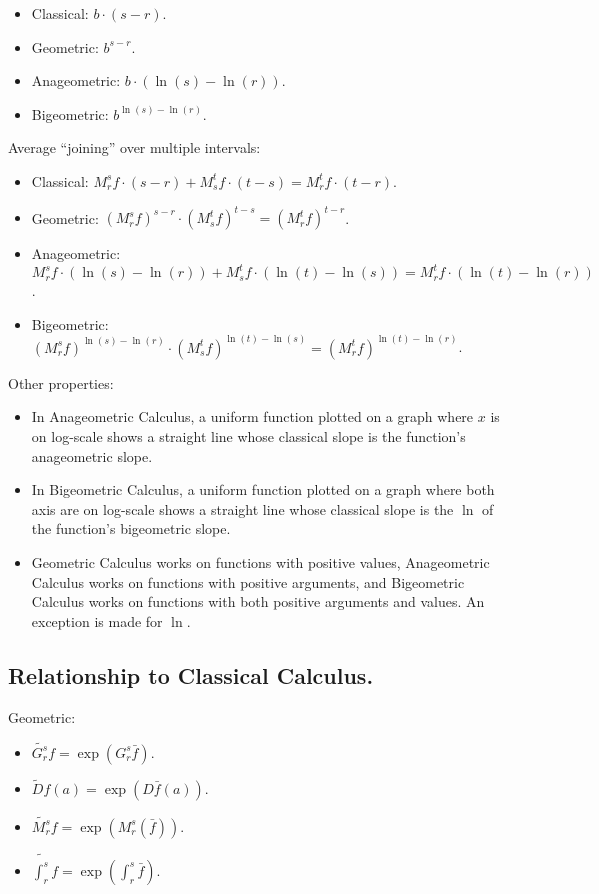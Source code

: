 \begin{itemize}
	\item Classical: $b \cdot (s - r)$.
	\item Geometric: $b^{s-r}$.
	\item Anageometric: $b \cdot (\ln(s) - \ln(r))$.
	\item Bigeometric: $b^{\ln(s) - \ln(r)}$.
\end{itemize}

Average \enquote{joining} over multiple intervals:

\begin{itemize}
	\item Classical: $M_r^s f \cdot (s - r) + M_s^t f \cdot (t - s) = M_r^t f \cdot (t - r)$.
	\item Geometric: $(M_r^s f)^{s - r} \cdot (M_s^t f)^{t - s} = (M_r^t f)^{t - r}$.
	\item Anageometric: $M_r^s f \cdot (\ln(s) - \ln(r)) + M_s^t f \cdot (\ln(t) - \ln(s)) = M_r^t f \cdot (\ln(t) - \ln(r))$.
	\item Bigeometric: $(M_r^s f)^{\ln(s) - \ln(r)} \cdot (M_s^t f)^{\ln(t) - \ln(s)} = (M_r^t f)^{\ln(t) - \ln(r)}$.
\end{itemize}

Other properties:

\begin{itemize}
	\item In Anageometric Calculus, a uniform function plotted on a graph where $x$ is on log-scale shows a straight line whose classical slope is the function's anageometric slope.
	\item In Bigeometric Calculus, a uniform function plotted on a graph where both axis are on log-scale shows a straight line whose classical slope is the $\ln$ of the function's bigeometric slope. 
	\item Geometric Calculus works on functions with positive values, Anageometric Calculus works on functions with positive arguments, and Bigeometric Calculus works on functions with both positive arguments and values. An exception is made for $\ln$.
\end{itemize}

\subsection{Relationship to Classical Calculus.}

Geometric:

\begin{itemize}
	\item $\tilde{G_r^s}f = \exp(G_r^s \bar{f})$.
	\item $\tilde{D}f(a) = \exp(D\bar{f}(a))$.
	\item $\tilde{M_r^s}f = \exp(M_r^s(\bar{f}))$.
	\item $\tilde{\int_r^s} f = \exp(\int_r^s \bar{f})$.
\end{itemize}

